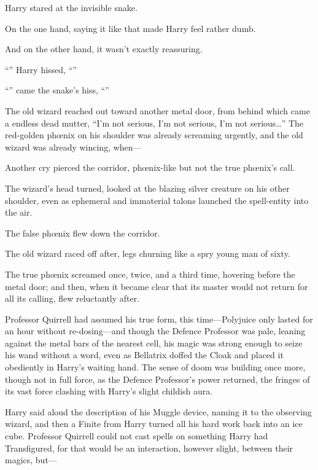 Harry stared at the invisible snake.

On the one hand, saying it like that made Harry feel rather dumb.

And on the other hand, it wasn’t exactly reassuring.

“” Harry hissed, “”

“” came the snake’s hiss, “”

\later

The old wizard reached out toward another metal door, from behind which came a endless dead mutter, “I’m not serious, I’m not serious, I’m not serious…” The red-golden phœnix on his shoulder was already screaming urgently, and the old wizard was already wincing, when—

Another cry pierced the corridor, phœnix-like but not the true phœnix’s call.

The wizard’s head turned, looked at the blazing silver creature on his other shoulder, even as ephemeral and immaterial talons launched the spell-entity into the air.

The false phœnix flew down the corridor.

The old wizard raced off after, legs churning like a spry young man of sixty.

The true phœnix screamed once, twice, and a third time, hovering before the metal door; and then, when it became clear that its master would not return for all its calling, flew reluctantly after.

\later

Professor Quirrell had assumed his true form, this time—Polyjuice only lasted for an hour without re-dosing—and though the Defence Professor was pale, leaning against the metal bars of the nearest cell, his magic was strong enough to seize his wand without a word, even as Bellatrix doffed the Cloak and placed it obediently in Harry’s waiting hand. The sense of doom was building once more, though not in full force, as the Defence Professor’s power returned, the fringes of its vast force clashing with Harry’s slight childish aura.

Harry said aloud the description of his Muggle device, naming it to the observing wizard, and then a Finite from Harry turned all his hard work back into an ice cube. Professor Quirrell could not cast spells on something Harry had Transfigured, for that would be an interaction, however slight, between their magics, but—


